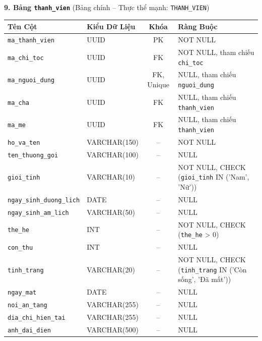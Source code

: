 \noindent\textbf{9. Bảng \texttt{thanh\_vien}} \quad (Bảng chính -- Thực thể mạnh: \texttt{THANH\_VIEN})
\vspace{0.2cm}

\begin{center}
\small
\renewcommand{\arraystretch}{1.2}
\begin{tabular}{|p{3.8cm}|p{2.5cm}|c|p{6.5cm}|}
\hline
\textbf{Tên Cột} & \textbf{Kiểu Dữ Liệu} & \textbf{Khóa} & \textbf{Ràng Buộc} \\ \hline
\texttt{ma\_thanh\_vien} & UUID & PK & NOT NULL \\ \hline
\texttt{ma\_chi\_toc} & UUID & FK & NOT NULL, tham chiếu \texttt{chi\_toc} \\ \hline
\texttt{ma\_nguoi\_dung} & UUID & FK, Unique & NULL, tham chiếu \texttt{nguoi\_dung} \\ \hline
\texttt{ma\_cha} & UUID & FK & NULL, tham chiếu \texttt{thanh\_vien} \\ \hline
\texttt{ma\_me} & UUID & FK & NULL, tham chiếu \texttt{thanh\_vien} \\ \hline
\texttt{ho\_va\_ten} & VARCHAR(150) & -- & NOT NULL \\ \hline
\texttt{ten\_thuong\_goi} & VARCHAR(100) & -- & NULL \\ \hline
\texttt{gioi\_tinh} & VARCHAR(10) & -- & NOT NULL, CHECK (\texttt{gioi\_tinh} IN ('Nam', 'Nữ')) \\ \hline
\texttt{ngay\_sinh\_duong\_lich} & DATE & -- & NULL \\ \hline
\texttt{ngay\_sinh\_am\_lich} & VARCHAR(50) & -- & NULL \\ \hline
\texttt{the\_he} & INT & -- & NOT NULL, CHECK (\texttt{the\_he} > 0) \\ \hline
\texttt{con\_thu} & INT & -- & NULL \\ \hline
\texttt{tinh\_trang} & VARCHAR(20) & -- & NOT NULL, CHECK (\texttt{tinh\_trang} IN ('Còn sống', 'Đã mất')) \\ \hline
\texttt{ngay\_mat} & DATE & -- & NULL \\ \hline
\texttt{noi\_an\_tang} & VARCHAR(255) & -- & NULL \\ \hline
\texttt{dia\_chi\_hien\_tai} & VARCHAR(255) & -- & NULL \\ \hline
\texttt{anh\_dai\_dien} & VARCHAR(500) & -- & NULL \\ \hline
\end{tabular}
\end{center}
\vspace{0.3cm}

